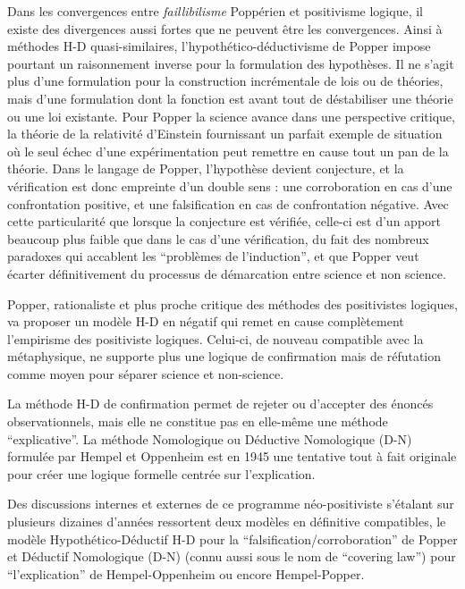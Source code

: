 Dans les convergences entre \textit{faillibilisme} Poppérien et positivisme logique, il existe des divergences aussi fortes que ne peuvent être les convergences. Ainsi à méthodes H-D quasi-similaires, l'hypothético-déductivisme de Popper impose pourtant un raisonnement inverse pour la formulation des hypothèses. Il ne s'agit plus d'une formulation pour la construction incrémentale de lois ou de théories, mais d'une formulation dont la fonction est avant tout de déstabiliser une théorie ou une loi existante. Pour Popper la science avance dans une perspective critique, la théorie de la relativité d'Einstein fournissant un parfait exemple de situation où le seul échec d'une expérimentation peut remettre en cause tout un pan de la théorie. Dans le langage de Popper, l'hypothèse devient conjecture, et la vérification est donc empreinte d'un double sens : une corroboration en cas d'une confrontation positive, et une falsification en cas de confrontation négative. Avec cette particularité que lorsque la conjecture est vérifiée, celle-ci est d'un apport beaucoup plus faible que dans le cas d'une vérification, du fait des nombreux paradoxes qui accablent les \enquote{problèmes de l'induction}, et que Popper veut écarter définitivement du processus de démarcation entre science et non science.

Popper, rationaliste et plus proche critique des méthodes des positivistes logiques, va proposer un modèle H-D en négatif qui remet en cause complètement l'empirisme des positiviste logiques. Celui-ci, de nouveau compatible avec la métaphysique, ne supporte plus une logique de confirmation mais de réfutation comme moyen pour séparer science et non-science.

La méthode H-D de confirmation permet de rejeter ou d'accepter des énoncés observationnels, mais elle ne constitue pas en elle-même une méthode \enquote{explicative}. La méthode Nomologique ou Déductive Nomologique (D-N) formulée par Hempel et Oppenheim est en 1945 une tentative tout à fait originale pour créer une logique formelle centrée sur l'explication.

Des discussions internes et externes de ce programme néo-positiviste s'étalant sur plusieurs dizaines d'années ressortent deux modèles en définitive compatibles, le modèle Hypothético-Déductif H-D pour la \enquote{falsification/corroboration} de Popper et Déductif Nomologique (D-N) (connu aussi sous le nom de \foreignquote{english}{covering law}) pour \enquote{l'explication} de Hempel-Oppenheim ou encore Hempel-Popper.

